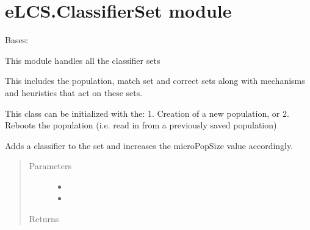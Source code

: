 \documentclass[letterpaper,10pt,english]{sphinxmanual}
\begin{document}
\section{eLCS.ClassifierSet module}
\label{\detokenize{eLCS:module-eLCS.ClassifierSet}}\label{\detokenize{eLCS:elcs-classifierset-module}}

\begin{fulllineitems}
\label{\detokenize{eLCS:eLCS.ClassifierSet.ClassifierSet}}
Bases: 

This module handles all the classifier sets

This includes the population, match set and correct sets along with mechanisms and
heuristics that act on these sets.

This class can be initialized with the:
1.  Creation of a new population, or
2.  Reboots the population (i.e. read in from a previously saved population)

\begin{fulllineitems}
\label{\detokenize{eLCS:eLCS.ClassifierSet.ClassifierSet.addClassifierToPopulation}}
Adds a classifier to the set and increases the microPopSize value accordingly.
\begin{quote}\begin{description}
\item[{Parameters}] \leavevmode\begin{itemize}
\item {} 
 \textendash{} 

\item {} 
 \textendash{} 

\end{itemize}

\item[{Returns}] \leavevmode


\end{description}\end{quote}

\end{fulllineitems}



\end{fulllineitems}
\end{document}
